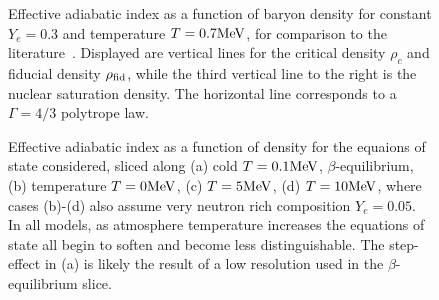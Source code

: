 \begin{figure}
	\centering
	
	\caption[Adiabatic index vs. density for constant composition and temperature]
	{
		Effective adiabatic index as a function of baryon density for constant $Y_e = 0.3$ and temperature $T = 0.7 {\rm MeV}$, for comparison to the literature~\cite{Fischer2014}.  Displayed are vertical lines for the critical density $\rho_c$ and fiducial density $\rho_{\rm fid}$, while the third vertical line to the right is the nuclear saturation density.  The horizontal line corresponds to a $\Gamma = 4/3$ polytrope law.
	}
	\label{fig:OneGammavsRho}
\end{figure}


\begin{figure}[]
	\centering
	\footnotesize{	
		
	}
	\caption[Adiabatic index vs. density for constant $Y_e = 0.3$, varying temperature]
	{
		Effective adiabatic index as a function of density for the equaions of state considered, sliced along 
		(a) cold $T=0.1 {\rm MeV}$, $\beta$-equilibrium,
		(b) temperature $T=0 {\rm MeV}$,
		(c) $T=5{\rm MeV}$,
		(d) $T=10{\rm MeV}$,
		where cases (b)-(d) also assume very neutron rich composition $Y_e = 0.05$.  In all models, as atmosphere temperature increases the equations of state all begin to soften and become less distinguishable.  
		The step-effect in (a) is likely the result of a low resolution used in the $\beta$-equilibrium slice. 
	}
	\label{fig:MultGammavsRho}
\end{figure}
